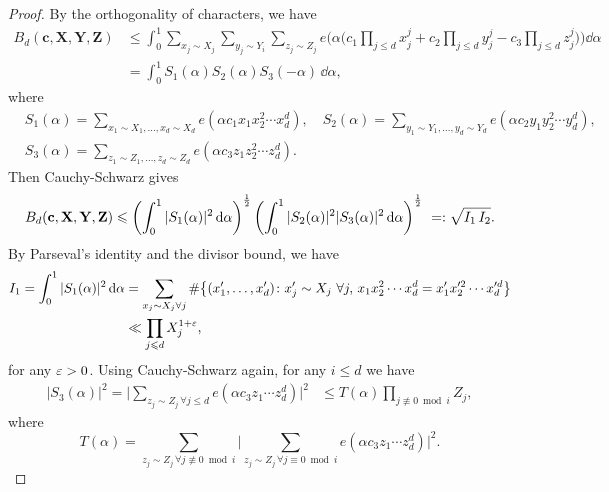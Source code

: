 \begin{proof}
By the orthogonality of characters, we have
\begin{align*}
B_d(\mathbf{c},\mathbf{X},\mathbf{Y},\mathbf{Z}) &\leq \int_0^1 \sum_{x_j\sim X_j}\sum_{y_j\sim Y_i}\sum_{z_j\sim Z_j}e\Big(\alpha\Big(c_1\prod_{j\leq d}x_j^j+c_2\prod_{j\leq d}y_j^j-c_3\prod_{j\leq d}z_j^j\Big)\Big)\dd{\alpha} \nonumber\\
&= \int_{0}^1 S_1(\alpha)S_2(\alpha)S_3(-\alpha)\, \dd \alpha,
\end{align*}
where
\begin{align*}
&S_1(\alpha)=\sum_{x_1\sim X_1,\ldots, x_d\sim X_d}e(\alpha c_1x_1x_2^2\cdots x_d^d),\quad S_2(\alpha)=\sum_{y_1\sim Y_1,\ldots, y_d\sim Y_d}e(\alpha c_2y_1y_2^2\cdots y_d^d),\\
&S_3(\alpha)=\sum_{z_1\sim Z_1,\ldots, z_d\sim Z_d}e(\alpha c_3z_1z_2^2\cdots z_d^d).
\end{align*}
Then Cauchy-Schwarz gives
\begin{align}\label{eq:Bc123}
B_d(\mathbf{c},\mathbf{X},\mathbf{Y},\mathbf{Z}) \leqslant \left(\int_{0}^1|S_1(\alpha)|^2\, \textnormal{d}\alpha\right)^{\frac{1}{2}}\left(\int_{0}^1|S_2(\alpha)|^2|S_3(\alpha)|^2\, \textnormal{d}\alpha\right)^{\frac{1}{2}} \ =: \sqrt{I_1\,I_2}.
\end{align}
By Parseval's identity and the divisor bound, we have
\begin{align}\label{eq:prop3.1I1}\begin{split}
I_1 =\int_{0}^1|S_1(\alpha)|^2\, \textnormal{d}\alpha
&= \sum_{x_j\sim X_j\forall j}\#\big\{(x_1',\ldots, x_d')\colon x_j'\sim X_j\,\, \forall j,\, x_1x_2^2\cdots x_d^d=x_1'x_2'^2\cdots x_d'^d \big\}\\
& \ll \prod_{j\leqslant d} X_j^{1+\varepsilon},
\end{split}
\end{align}
for any $\varepsilon>0$.
Using Cauchy-Schwarz again, for any $i\le d$ we have
\begin{align*}
|S_3(\alpha)|^2 = \bigg|\sum_{z_j\sim Z_j\,\forall j\leq d}e(\alpha c_3z_1\cdots z_d^d)\bigg|^2
&\leq T(\alpha)\prod_{j\not \equiv 0\bmod i}Z_{j},
\end{align*}
where
\[
T(\alpha)=
\sum_{z_j\sim Z_j\, \forall j\not \equiv 0\bmod i}\bigg|\sum_{z_j\sim Z_j\, \forall j\equiv 0\bmod i}e(\alpha c_3z_1\cdots z_d^d)\bigg|^2.
\]


\end{proof}
